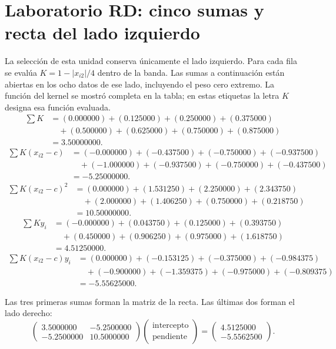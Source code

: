 \documentclass[11pt,a4paper]{article}
\begin{document}
\section{Laboratorio RD: cinco sumas y recta del lado izquierdo}\label{unidad51}
La selección de esta unidad conserva únicamente el lado izquierdo.
Para cada fila se evalúa \(K=1-|x_{i2}|/4\) dentro de la banda.
Las sumas a continuación están abiertas en los ocho
datos de ese lado, incluyendo el peso cero extremo.
La función del kernel se mostró completa en la tabla;
en estas etiquetas la letra \(K\) designa esa función evaluada.
\[
\begin{aligned}
\sum K&=(0.000000)+(0.125000)+(0.250000)+(0.375000)\\&\quad+(0.500000)+(0.625000)+(0.750000)+(0.875000)\\&=3.50000000.\end{aligned}
\]
\[
\begin{aligned}
\sum K(x_{i2}-c)&=(-0.000000)+(-0.437500)+(-0.750000)+(-0.937500)\\&\quad+(-1.000000)+(-0.937500)+(-0.750000)+(-0.437500)\\&=-5.25000000.\end{aligned}
\]
\[
\begin{aligned}
\sum K(x_{i2}-c)^2&=(0.000000)+(1.531250)+(2.250000)+(2.343750)\\&\quad+(2.000000)+(1.406250)+(0.750000)+(0.218750)\\&=10.50000000.\end{aligned}
\]
\[
\begin{aligned}
\sum Ky_i&=(-0.000000)+(0.043750)+(0.125000)+(0.393750)\\&\quad+(0.450000)+(0.906250)+(0.975000)+(1.618750)\\&=4.51250000.\end{aligned}
\]
\[
\begin{aligned}
\sum K(x_{i2}-c)y_i&=(0.000000)+(-0.153125)+(-0.375000)+(-0.984375)\\&\quad+(-0.900000)+(-1.359375)+(-0.975000)+(-0.809375)\\&=-5.55625000.\end{aligned}
\]

Las tres primeras sumas forman la matriz de la recta.
Las últimas dos forman el lado derecho:
\[
\begin{pmatrix}3.5000000&-5.2500000\\-5.2500000&10.5000000\end{pmatrix}\begin{pmatrix}\text{intercepto}\\\text{pendiente}\end{pmatrix}=\begin{pmatrix}4.5125000\\-5.5562500\end{pmatrix}.
\]
\end{document}
